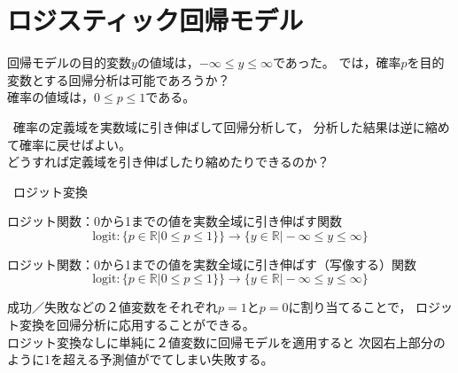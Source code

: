 \newcommand{\Draft}{}
\newcommand{\Slide}{}
\newcommand{\PrintLecture}{1}
\newcommand{\PrintSolution}{1}








\maketitle

\MyFrame{}{\tableofcontents}

\section{ロジスティック回帰モデル}

\MyFrame{\insertsection}
{
  回帰モデルの目的変数$y$の値域は，$-\infty\le y \le \infty$であった。
  では，確率$p$を目的変数とする回帰分析は可能であろうか？\\
  確率の値域は，$0\le p \le 1$である。
}

\MyFrame{\insertsection}
{
  \ra~確率の定義域を実数域に引き伸ばして回帰分析して，
  分析した結果は逆に縮めて確率に戻せばよい。\\
  どうすれば定義域を引き伸ばしたり縮めたりできるのか？\\[3mm]
  \begin{center}
    \ra~ロジット変換
  \end{center}
}

{
  ロジット関数：0から1までの値を実数全域に引き伸ばす関数
  \[\mathrm{logit}: \{p\in \mathds{R}|0\le p\le 1\}\}
  \rightarrow \{y\in \mathds{R}|-\infty \le y \le \infty\}\]
}

{
  ロジット関数：0から1までの値を実数全域に引き伸ばす（写像する）関数
  \[\mathrm{logit}: \{p\in \mathds{R}|0\le p\le 1\}\}
  \rightarrow \{y\in \mathds{R}|-\infty \le y \le \infty\}\]
}

\MyFrame{}
{
  成功／失敗などの２値変数をそれぞれ$p=1$と$p=0$に割り当てることで，
  ロジット変換を回帰分析に応用することができる。\\
  ロジット変換なしに単純に２値変数に回帰モデルを適用すると
  次図右上部分のように1を超える予測値がでてしまい失敗する。
}

